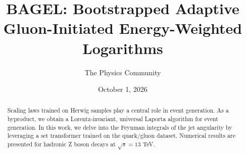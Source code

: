 \documentclass[11pt]{article}
\title{BAGEL: Bootstrapped Adaptive Gluon-Initiated Energy-Weighted Logarithms}
\author{The Physics Community}
\date{October 1, 2026}
\begin{document}
\maketitle
\begin{abstract}
Scaling laws trained on Herwig samples play a central role in event
generation. As a byproduct, we obtain a Lorentz-invariant, universal
Laporta algorithm for event generation. In this work, we delve into the
Feynman integrals of the jet angularity by leveraging a set transformer
trained on the quark/gluon dataset. Numerical results are presented for
hadronic Z boson decays at $\sqrt{s} = 13$ TeV.
\end{abstract}
\tableofcontents




\nocite{*}


\end{document}
